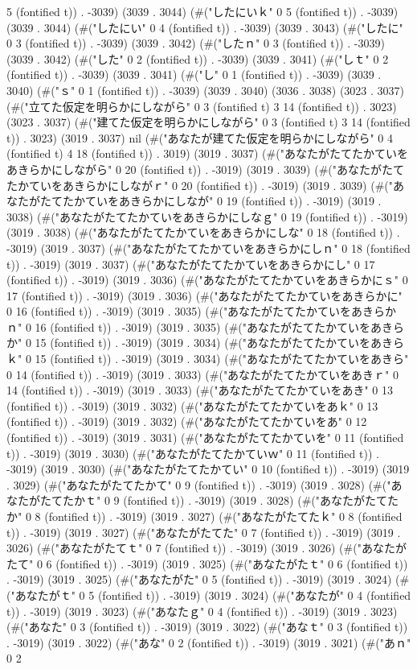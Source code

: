 5 (fontified t)) . -3039) (3039 . 3044) (#("したにいｋ" 0 5 (fontified t)) . -3039) (3039 . 3044) (#("したにい" 0 4 (fontified t)) . -3039) (3039 . 3043) (#("したに" 0 3 (fontified t)) . -3039) (3039 . 3042) (#("したｎ" 0 3 (fontified t)) . -3039) (3039 . 3042) (#("した" 0 2 (fontified t)) . -3039) (3039 . 3041) (#("しｔ" 0 2 (fontified t)) . -3039) (3039 . 3041) (#("し" 0 1 (fontified t)) . -3039) (3039 . 3040) (#("ｓ" 0 1 (fontified t)) . -3039) (3039 . 3040) (3036 . 3038) (3023 . 3037) (#("立てた仮定を明らかにしながら" 0 3 (fontified t) 3 14 (fontified t)) . 3023) (3023 . 3037) (#("建てた仮定を明らかにしながら" 0 3 (fontified t) 3 14 (fontified t)) . 3023) (3019 . 3037) nil (#("あなたが建てた仮定を明らかにしながら" 0 4 (fontified t) 4 18 (fontified t)) . 3019) (3019 . 3037) (#("あなたがたてたかていをあきらかにしながら" 0 20 (fontified t)) . -3019) (3019 . 3039) (#("あなたがたてたかていをあきらかにしながｒ" 0 20 (fontified t)) . -3019) (3019 . 3039) (#("あなたがたてたかていをあきらかにしなが" 0 19 (fontified t)) . -3019) (3019 . 3038) (#("あなたがたてたかていをあきらかにしなｇ" 0 19 (fontified t)) . -3019) (3019 . 3038) (#("あなたがたてたかていをあきらかにしな" 0 18 (fontified t)) . -3019) (3019 . 3037) (#("あなたがたてたかていをあきらかにしｎ" 0 18 (fontified t)) . -3019) (3019 . 3037) (#("あなたがたてたかていをあきらかにし" 0 17 (fontified t)) . -3019) (3019 . 3036) (#("あなたがたてたかていをあきらかにｓ" 0 17 (fontified t)) . -3019) (3019 . 3036) (#("あなたがたてたかていをあきらかに" 0 16 (fontified t)) . -3019) (3019 . 3035) (#("あなたがたてたかていをあきらかｎ" 0 16 (fontified t)) . -3019) (3019 . 3035) (#("あなたがたてたかていをあきらか" 0 15 (fontified t)) . -3019) (3019 . 3034) (#("あなたがたてたかていをあきらｋ" 0 15 (fontified t)) . -3019) (3019 . 3034) (#("あなたがたてたかていをあきら" 0 14 (fontified t)) . -3019) (3019 . 3033) (#("あなたがたてたかていをあきｒ" 0 14 (fontified t)) . -3019) (3019 . 3033) (#("あなたがたてたかていをあき" 0 13 (fontified t)) . -3019) (3019 . 3032) (#("あなたがたてたかていをあｋ" 0 13 (fontified t)) . -3019) (3019 . 3032) (#("あなたがたてたかていをあ" 0 12 (fontified t)) . -3019) (3019 . 3031) (#("あなたがたてたかていを" 0 11 (fontified t)) . -3019) (3019 . 3030) (#("あなたがたてたかていｗ" 0 11 (fontified t)) . -3019) (3019 . 3030) (#("あなたがたてたかてい" 0 10 (fontified t)) . -3019) (3019 . 3029) (#("あなたがたてたかて" 0 9 (fontified t)) . -3019) (3019 . 3028) (#("あなたがたてたかｔ" 0 9 (fontified t)) . -3019) (3019 . 3028) (#("あなたがたてたか" 0 8 (fontified t)) . -3019) (3019 . 3027) (#("あなたがたてたｋ" 0 8 (fontified t)) . -3019) (3019 . 3027) (#("あなたがたてた" 0 7 (fontified t)) . -3019) (3019 . 3026) (#("あなたがたてｔ" 0 7 (fontified t)) . -3019) (3019 . 3026) (#("あなたがたて" 0 6 (fontified t)) . -3019) (3019 . 3025) (#("あなたがたｔ" 0 6 (fontified t)) . -3019) (3019 . 3025) (#("あなたがた" 0 5 (fontified t)) . -3019) (3019 . 3024) (#("あなたがｔ" 0 5 (fontified t)) . -3019) (3019 . 3024) (#("あなたが" 0 4 (fontified t)) . -3019) (3019 . 3023) (#("あなたｇ" 0 4 (fontified t)) . -3019) (3019 . 3023) (#("あなた" 0 3 (fontified t)) . -3019) (3019 . 3022) (#("あなｔ" 0 3 (fontified t)) . -3019) (3019 . 3022) (#("あな" 0 2 (fontified t)) . -3019) (3019 . 3021) (#("あｎ" 0 2 